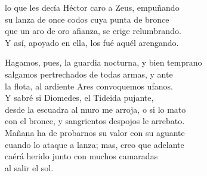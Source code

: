 lo que les decía Héctor caro a Zeus, empuñando\\
su lanza de once codos cuya punta de bronce\\
que un aro de oro afianza, se erige relumbrando.\\
Y así, apoyado en ella, los fué aquél arengando.\par
\poend
\separator
%
\postart
{}
Hagamos, pues, la guardia nocturna, y bien temprano\\
salgamos pertrechados de todas armas, y ante\\
la flota, al ardiente Ares convoquemos ufanos.\\
Y sabré si Diomedes, el Tideida pujante,\\
desde la escuadra al muro me arroja, o si lo mato\\
con el bronce, y sangrientos despojos le arrebato.\\
Mañana ha de probarnos su valor con su aguante\\
cuando lo ataque a lanza; mas, creo que adelante\\
caérá herido junto con muchos camaradas\\
al salir el sol.\par
\poend
\separator
\enum